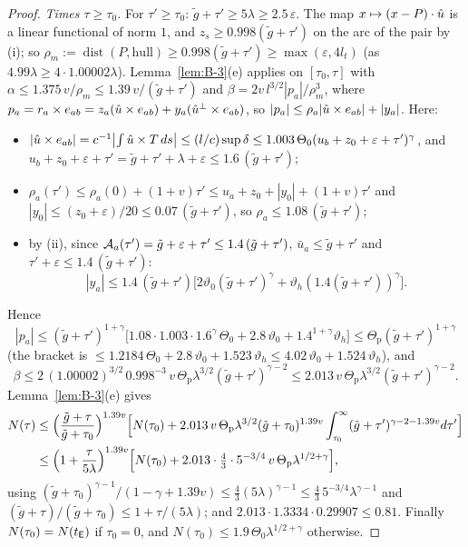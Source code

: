 \begin{proof}
\emph{Times $\tau\ge\tau_0$.} For $\tau'\ge\tau_0$: $\tilde g+\tau'\ge5\lambda\ge2.5\,\varepsilon$. The map $x\mapsto(x-P)\cdot\hat u$
is a linear functional of norm $1$, and $z_s\ge0.998(\tilde g+\tau')$ on the arc of the pair by (i); so
$\rho_m:=\operatorname{dist}(P,\text{hull})\ge0.998(\tilde g+\tau')\ge\max(\varepsilon,4l_t)$ (as
$4.99\lambda\ge4\cdot1.00002\lambda$). Lemma~\ref{lem:B-3}(e) applies on $[\tau_0,\tau]$ with
$\alpha\le1.375\,v/\rho_m\le1.39\,v/(\tilde g+\tau')$ and $\beta=2v\,l^{3/2}|p_a|/\rho_m^3$, where
$p_a=r_a\times e_{ab}=z_a(\hat u\times e_{ab})+y_a(\hat u^\perp\times e_{ab})$, so $|p_a|\le\rho_a|\hat u\times e_{ab}|+|y_a|$. Here:
\begin{itemize}
\item $|\hat u\times e_{ab}|=c^{-1}\bigl|\int\hat u\times T\,ds\bigr|\le(l/c)\sup\delta\le1.003\,\Theta_0(u_b+z_0+\varepsilon+\tau')^\gamma$,
and $u_b+z_0+\varepsilon+\tau'=\tilde g+\tau'+\lambda+\varepsilon\le1.6\,(\tilde g+\tau')$;
\item $\rho_a(\tau')\le\rho_a(0)+(1+v)\tau'\le u_a+z_0+|y_0|+(1+v)\tau'$ and
$|y_0|\le(z_0+\varepsilon)/20\le0.07\,(\tilde g+\tau')$, so $\rho_a\le1.08\,(\tilde g+\tau')$;
\item by (ii), since $\mathcal A_a(\tau')=\tilde g+\varepsilon+\tau'\le1.4\,(\tilde g+\tau')$, $\bar u_a\le\tilde g+\tau'$ and
$\tau'+\varepsilon\le1.4\,(\tilde g+\tau')$:
\[
|y_a|\le1.4\,(\tilde g+\tau')\bigl[2\vartheta_0(\tilde g+\tau')^\gamma+\vartheta_h(1.4(\tilde g+\tau'))^\gamma\bigr].
\]
\end{itemize}
Hence
\[
|p_a|\le(\tilde g+\tau')^{1+\gamma}\bigl[1.08\cdot1.003\cdot1.6^\gamma\,\Theta_0+2.8\,\vartheta_0+1.4^{1+\gamma}\vartheta_h\bigr]
\le\Theta_{\mathrm p}(\tilde g+\tau')^{1+\gamma}
\]
(the bracket is $\le1.2184\,\Theta_0+2.8\,\vartheta_0+1.523\,\vartheta_h\le4.02\,\vartheta_0+1.524\,\vartheta_h$), and
\[
\beta\le2\,(1.00002)^{3/2}\,0.998^{-3}\,v\,\Theta_{\mathrm p}\lambda^{3/2}(\tilde g+\tau')^{\gamma-2}
\le2.013\,v\,\Theta_{\mathrm p}\lambda^{3/2}(\tilde g+\tau')^{\gamma-2}.
\]
Lemma~\ref{lem:B-3}(e) gives
\begin{align*}
N(\tau)&\le\Bigl(\frac{\tilde g+\tau}{\tilde g+\tau_0}\Bigr)^{1.39v}\Bigl[N(\tau_0)
+2.013\,v\,\Theta_{\mathrm p}\lambda^{3/2}(\tilde g+\tau_0)^{1.39v}\int_{\tau_0}^\infty(\tilde g+\tau')^{\gamma-2-1.39v}d\tau'\Bigr]\\
&\le\Bigl(1+\frac\tau{5\lambda}\Bigr)^{1.39v}\Bigl[N(\tau_0)+2.013\cdot\tfrac43\cdot5^{-3/4}\,v\,\Theta_{\mathrm p}\lambda^{1/2+\gamma}\Bigr],
\end{align*}
using $(\tilde g+\tau_0)^{\gamma-1}/(1-\gamma+1.39v)\le\frac43(5\lambda)^{\gamma-1}\le\frac43\,5^{-3/4}\lambda^{\gamma-1}$ and
$(\tilde g+\tau)/(\tilde g+\tau_0)\le1+\tau/(5\lambda)$; and $2.013\cdot1.3334\cdot0.29907\le0.81$. Finally $N(\tau_0)=N(t_{\mathsf E})$
if $\tau_0=0$, and $N(\tau_0)\le1.9\,\Theta_0\lambda^{1/2+\gamma}$ otherwise.
\end{proof}


